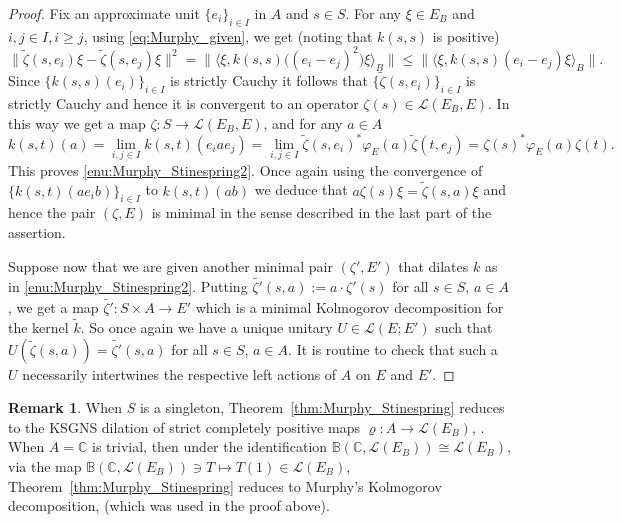 \documentclass[11 pt, leqno]{amsart}
\numberwithin{equation}{section}
\theoremstyle{plain}
\theoremstyle{definition}
\newtheorem {rem} [thm]{Remark}
\newcommand{\BB}{\mathbb B}
\newcommand{\K}{\mathcal{K}}
\renewcommand{\L}{\mathcal L}
\newcommand{\C}{\mathbb C}
\begin{document}
\begin{proof}
Fix an approximate unit $\{e_i\}_{i \in I}$ in $A$ and $s\in S$. 
For any $\xi\in E_B$ and $i, j \in I, i\geq j$, using \eqref{eq:Murphy_given}, we get (noting that $k(s,s)$ is positive)
\[
    \|\tilde{\zeta}(s,e_i)\xi- \tilde{\zeta}(s,e_j)\xi\|^2=\|\langle \xi, k(s,s)\big((e_i-e_j)^2\big)\xi\rangle_B\|\leq \|\langle \xi, k(s,s)(e_i-e_j)\xi\rangle_B\|.
\]
Since  $\{k(s,s)(e_i)\}_{i \in I}$ is strictly Cauchy it follows that $\{\tilde{\zeta}(s,e_i)\}_{i \in I}$ is strictly Cauchy and hence it is convergent to an operator  $\zeta(s)\in  \L(E_B,E)$. 
In this way we get a map $\zeta:S \to \L(E_B,E)$, and for any $a\in A$ 
\[
    k(s,t)(a)=\lim_{i,j\in I}k(s,t)(e_iae_j)=\lim_{i,j\in I}\tilde{\zeta}(s,e_i)^*\varphi_E(a) \tilde{\zeta}(t,e_j)=\zeta(s)^* \varphi_E(a) \zeta(t).
\]
This proves \ref{enu:Murphy_Stinespring2}. 
Once again using the convergence of $\{k(s,t)(ae_i b)\}_{i \in I}$ to $k(s,t)(ab)$ we deduce that $a\zeta(s)\xi=\tilde{\zeta}(s,a)\xi$ and hence the pair $(\zeta,E)$ is minimal in the sense described in the last part of the assertion.

Suppose now that we are given another minimal pair $(\zeta',E')$ that dilates $k$ as in \ref{enu:Murphy_Stinespring2}. 
Putting $\tilde{\zeta'}(s,a):= a \cdot\zeta'(s)$ for all $s \in S$, $a \in A$,
we get a map $\tilde{\zeta'}: S\times A \to E'$ which is a minimal Kolmogorov decomposition for the kernel $\tilde{k}$. 
So once again we have a unique unitary $U\in \L(E;E')$ such that $U(\tilde{\zeta}(s,a)) = \tilde{\zeta'}(s,a)$ for all $s \in S$, $a \in A$. 
It is routine to check that such a $U$ necessarily intertwines the respective left actions of $A$ on $E$ and $E'$.
\end{proof}

\begin{rem}
When $S$ is a singleton, Theorem~\ref{thm:Murphy_Stinespring} reduces to the KSGNS dilation of strict completely positive maps $\varrho:A\to \L(E_B)$, \cite[Theorem 5.6]{Lance}. 
When $A=\C$ is trivial, then under the identification $\BB(\C,\L(E_B))\cong \L(E_B)$, via the map $\BB(\C,\L(E_B))\ni T\mapsto T(1)\in \L(E_B)$, Theorem~\ref{thm:Murphy_Stinespring} reduces to Murphy's Kolmogorov decomposition, \cite[Theorem 2.3]{Mur} (which was used in the proof above).
\end{rem}
\end{document}
